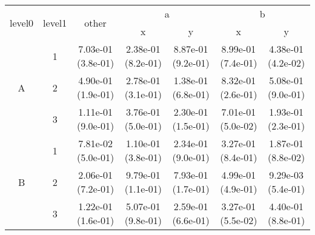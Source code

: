 \begin{tabular}{ccccccc}
\toprule
\multirow{2}{*}{level0} & \multirow{2}{*}{level1}& \multirow{2}{*}{other}&\multicolumn{2}{c}{a}&\multicolumn{2}{c}{b}\tabularnewline
\cmidrule(lr){4-5}
\cmidrule(lr){6-7}
&&&x&y&x&y\tabularnewline
\midrule
\multirow{3}{*}{A}&1& 7.03e-01 (3.8e-01)& 2.38e-01 (8.2e-01)& 8.87e-01 (9.2e-01)& 8.99e-01 (7.4e-01)& 4.38e-01 (4.2e-02)\tabularnewline
&2& 4.90e-01 (1.9e-01)& 2.78e-01 (3.1e-01)& 1.38e-01 (6.8e-01)& 8.32e-01 (2.6e-01)& 5.08e-01 (9.0e-01)\tabularnewline
&3& 1.11e-01 (9.0e-01)& 3.76e-01 (5.0e-01)& 2.30e-01 (1.5e-01)& 7.01e-01 (5.0e-02)& 1.93e-01 (2.3e-01)\tabularnewline
\midrule
\multirow{3}{*}{B}&1& 7.81e-02 (5.0e-01)& 1.10e-01 (3.8e-01)& 2.34e-01 (9.0e-01)& 3.27e-01 (8.4e-01)& 1.87e-01 (8.8e-02)\tabularnewline
&2& 2.06e-01 (7.2e-01)& 9.79e-01 (1.1e-01)& 7.93e-01 (1.7e-01)& 4.99e-01 (4.9e-01)& 9.29e-03 (5.4e-01)\tabularnewline
&3& 1.22e-01 (1.6e-01)& 5.07e-01 (9.8e-01)& 2.59e-01 (6.6e-01)& 3.27e-01 (5.5e-02)& 4.40e-01 (8.8e-01)\tabularnewline
\bottomrule
\end{tabular}
